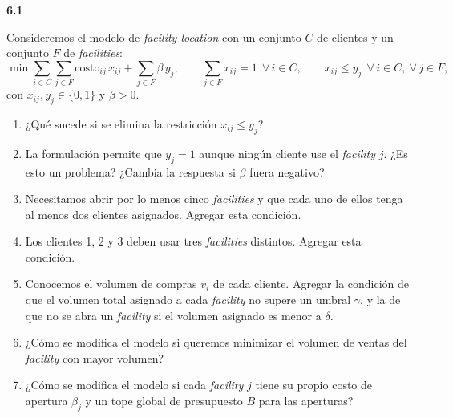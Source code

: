 \documentclass[11pt,a4paper]{article}
\newcommand{\ejercicio}[1]{\par\medskip\noindent\textbf{#1}\par\nopagebreak\smallskip}
\newcommand{\costo}{\mathrm{costo}}
\begin{document}
\ejercicio{6.1}
Consideremos el modelo de \emph{facility location} con un conjunto $C$ de
clientes y un conjunto $F$ de \emph{facilities}:
\[
\min \sum_{i \in C}\sum_{j \in F} \costo_{ij}\, x_{ij}
     + \sum_{j \in F} \beta\, y_j, \qquad
\sum_{j \in F} x_{ij} = 1 \ \ \forall\, i \in C, \qquad
x_{ij} \le y_j \ \ \forall\, i \in C,\ \forall\, j \in F,
\]
con $x_{ij}, y_j \in \{0,1\}$ y $\beta > 0$.
\begin{enumerate}[itemsep=1pt]
  \item ¿Qué sucede si se elimina la restricción $x_{ij} \le y_j$?
  \item La formulación permite que $y_j = 1$ aunque ningún cliente use el
  \emph{facility} $j$. ¿Es esto un problema? ¿Cambia la respuesta si $\beta$
  fuera negativo?
  \item Necesitamos abrir por lo menos cinco \emph{facilities} y que cada uno de
  ellos tenga al menos dos clientes asignados. Agregar esta condición.
  \item Los clientes 1, 2 y 3 deben usar tres \emph{facilities} distintos.
  Agregar esta condición.
  \item Conocemos el volumen de compras $v_i$ de cada cliente. Agregar la
  condición de que el volumen total asignado a cada \emph{facility} no supere un
  umbral $\gamma$, y la de que no se abra un \emph{facility} si el volumen
  asignado es menor a $\delta$.
  \item ¿Cómo se modifica el modelo si queremos minimizar el volumen de ventas
  del \emph{facility} con mayor volumen?
  \item ¿Cómo se modifica el modelo si cada \emph{facility} $j$ tiene su propio
  costo de apertura $\beta_j$ y un tope global de presupuesto $B$ para las
  aperturas?
\end{enumerate}
\end{document}
